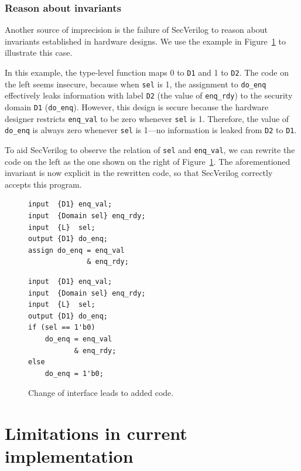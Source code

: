 \documentclass [12pt, oneside, a4paper]{article}
\newcommand{\code}[1]{\texttt{#1}}
\begin{document}
{%
\subsubsection{Reason about invariants}

Another source of imprecision is the failure of SecVerilog to reason
about invariants established in hardware designs. We use the example
in Figure~\ref{fig:change} to illustrate this case.

In this example, the type-level function maps 0 to \code{D1} and 1 to
\code{D2}.  The code on the left seems insecure, because when
\code{sel} is 1, the assignment to \code{do\_enq} effectively leaks
information with label \code{D2} (the value of \code{enq\_rdy}) to the
security domain \code{D1} (\code{do\_enq}). However, this design is
secure because the hardware designer restricts \code{enq\_val} to be
zero whenever \code{sel} is 1. Therefore, the value of \code{do\_enq}
is always zero whenever \code{sel} is 1---no information is leaked
from \code{D2} to \code{D1}.

To aid SecVerilog to observe the relation of \code{sel} and
\code{enq\_val}, we can rewrite the code on the left as the one shown
on the right of Figure~\ref{fig:change}. The aforementioned invariant
is now explicit in the rewritten code, so that SecVerilog correctly
accepts this program.

\begin{figure}
\begin{minipage}{.49\linewidth}
\begin{lstlisting}[numbers=none, framexleftmargin=0pt, framexbottommargin=36pt]
input  {D1} enq_val;
input  {Domain sel} enq_rdy;
input  {L}  sel;
output {D1} do_enq;
assign do_enq = enq_val 
              & enq_rdy;
\end{lstlisting}
\end{minipage}
\hfill
\begin{minipage}{.49\linewidth}
\begin{lstlisting}[numbers=none, framexleftmargin=0pt]
input  {D1} enq_val;
input  {Domain sel} enq_rdy;
input  {L}  sel;
output {D1} do_enq;
if (sel == 1'b0)
	do_enq = enq_val 
	       & enq_rdy;
else
	do_enq = 1'b0;
\end{lstlisting}
\end{minipage}
\caption{Change of interface leads to added code.}
\label{fig:change}
\end{figure}

\section{Limitations in current implementation}

}
\end{document}
